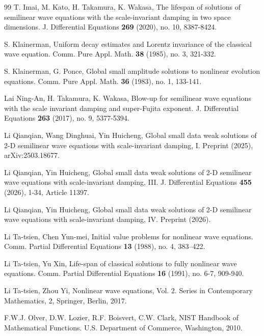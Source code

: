 \documentclass[11pt,twoside]{article}
\theoremstyle{plain}
\theoremstyle{definition}
\theoremstyle{remark}
\numberwithin{equation}{section}
\begin{document}
\begin{thebibliography}{99}
 T. Imai, M. Kato, H. Takamura, K. Wakasa,
The lifespan of solutions of semilinear wave equations with the scale-invariant damping in two space dimensions.
J. Differential Equations \textbf{269} (2020), no. 10, 8387-8424.



S. Klainerman, Uniform decay estimates and Lorentz invariance of the classical wave equation. Comm. Pure Appl.
Math. \textbf{38} (1985), no. 3, 321-332.



 S. Klainerman, G. Ponce,  Global small amplitude solutions to nonlinear evolution equations.
Comm. Pure Appl. Math. \textbf{36} (1983), no. 1, 133-141.



Lai Ning-An, H. Takamura, K. Wakasa, Blow-up for semilinear wave equations with the scale invariant damping and super-Fujita exponent.
J. Differential Equations \textbf{263} (2017),  no. 9, 5377-5394.



 Li Qianqian, Wang Dinghuai, Yin Huicheng,
Global small data weak solutions of 2-D semilinear wave equations
with  scale-invariant  damping, I.  Preprint (2025), arXiv:2503.18677.

 Li Qianqian, Yin Huicheng, Global small data weak solutions of 2-D semilinear wave equations
with scale-invariant damping, III. J. Differential Equations \textbf{455} (2026), 1-34, Article 11397.

 Li Qianqian, Yin Huicheng,
Global small data weak solutions of 2-D semilinear wave equations
with  scale-invariant  damping, IV. Preprint (2026).



 Li Ta-tsien, Chen Yun-mei,
Initial value problems for nonlinear wave equations.
Comm. Partial Differential Equations \textbf{13} (1988), no. 4, 383--422.





 Li Ta-tsien, Yu Xin, Life-span of classical solutions to fully nonlinear wave equations.
Comm. Partial Differential Equations \textbf{16} (1991), no. 6-7, 909-940.


 Li Ta-tsien, Zhou Yi,  Nonlinear wave equations, Vol. 2.
Series in Contemporary Mathematics, 2,  Springer, Berlin, 2017.



F.W.J. Olver, D.W. Lozier, R.F. Boisvert, C.W. Clark, NIST Handbook of Mathematical Functions. U.S. Department
of Commerce, Washington, 2010.



\end{thebibliography}
\end{document}
